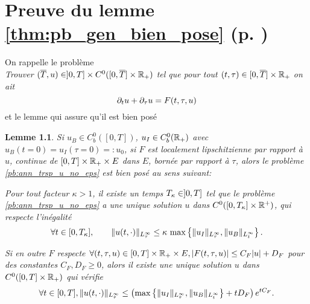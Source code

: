 \chapter{Preuve du lemme \ref{thm:pb_gen_bien_pose} (p. \pageref{thm:pb_gen_bien_pose})}
\label{chap:ann_preuve}

On rappelle le problème \\
\textit{Trouver $(\overline{T},u)\in]0,T]\times C^0([0,\overline{T}]\times\mathbb{R}_+)$ tel que pour tout $(t,\tau)\in[0,\overline{T}]\times\mathbb{R}_+$ on ait }
\begin{equation} \label{pb:ann_trsp_u_no_eps}
\partial_t u + \partial_{\tau} u = F(t,\tau,u) 
\end{equation}
et le lemme qui assure qu'il est bien posé 

\newtheorem*{annlemma}{Lemme}
\begin{annlemma} 
Si $u_B\in C^0_b([0,T])$, $u_I \in C^0_b(\mathbb{R}_+)$ avec $u_B(t=0) = u_I(\tau = 0) =: u_0$, si $F$ est localement lipschitzienne par rapport à $u$, continue de $[0,T]\times\mathbb{R}_+\times E$ dans $E$, bornée par rapport à $\tau$, alors le problème \eqref{pb:ann_trsp_u_no_eps} est bien posé au sens suivant: 
 
Pour tout facteur $\kappa > 1$, il existe un temps $T_{\kappa}\in]0,T]$ tel que le problème \eqref{pb:ann_trsp_u_no_eps} a une unique solution $u$ dans $C^0([0,T_{\kappa}]\times\mathbb{R}^+)$, qui respecte l'inégalité 
\begin{equation}
\forall t\in [0,T_{\kappa}], \qquad \|u(t,\cdot) \|_{L^{\infty}_{\tau}} \leq \kappa\, \max\left\{ \|u_I\|_{L^{\infty}_{\tau}}, \|u_B\|_{L^{\infty}_t} \right\}. 
\label{eq:ann_ineg_u_no_eps}
\end{equation}

Si en outre $F$ respecte $\forall (t,\tau,u)\in [0,T]\times\mathbb{R}_+\times E, |F(t,\tau,u)| \leq C_F |u| + D_F$ pour des constantes $C_F,D_F \geq 0$, alors il existe une unique solution $u$ dans $C^0([0,T]\times\mathbb{R}_+)$ qui vérifie 
\begin{equation}
\forall t\in[0,T], \|u(t,\cdot)\|_{L^{\infty}_{\tau}} \leq \left( \max\left\{ \|u_I\|_{L^{\infty}_{\tau}}, \|u_B\|_{L^{\infty}_t} \right\} + t D_F \right) e^{t C_F}. 
\label{eq:ann_ineg_lin_u}
\end{equation}

\end{annlemma}


